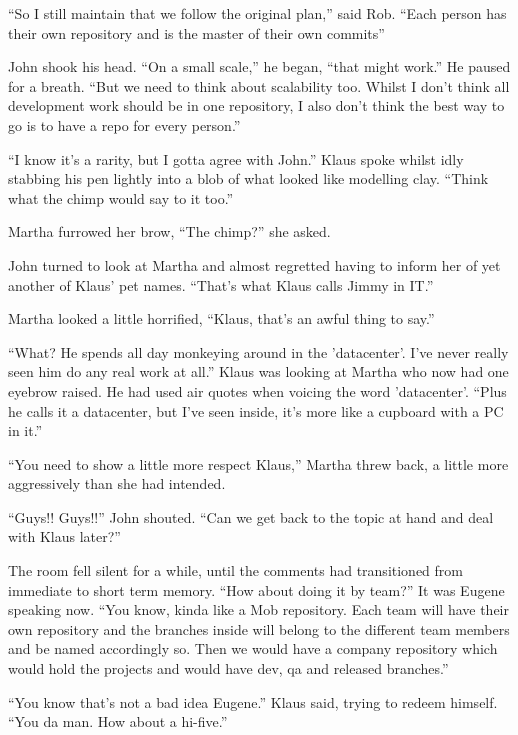 \begin{trenches}
``So I still maintain that we follow the original plan,'' said Rob.
``Each person has their own repository and is the master of their own commits''

John shook his head.
``On a small scale,'' he began,
``that might work.''
He paused for a breath.
``But we need to think about scalability too. Whilst I don't think all development work should be in one repository, I also don't think the best way to go is to have a repo for every person.''

``I know it's a rarity, but I gotta agree with John.'' Klaus spoke whilst idly stabbing his pen lightly into a blob of what looked like modelling clay.
``Think what the chimp would say to it too.''

Martha furrowed her brow,
``The chimp?'' she asked.

John turned to look at Martha and almost regretted having to inform her of yet another of Klaus' pet names.
``That's what Klaus calls Jimmy in IT.''

Martha looked a little horrified,
``Klaus, that's an awful thing to say.''

``What? He spends all day monkeying around in the 'datacenter'. I've never really seen him do any real work at all.''
Klaus was looking at Martha who now had one eyebrow raised.
He had used air quotes when voicing the word 'datacenter'.
``Plus he calls it a datacenter, but I've seen inside, it's more like a cupboard with a PC in it.''

``You need to show a little more respect Klaus,'' Martha threw back, a little more aggressively than she had intended.

``Guys!! Guys!!'' John shouted.
``Can we get back to the topic at hand and deal with Klaus later?''

The room fell silent for a while, until the comments had transitioned from immediate to short term memory.
``How about doing it by team?''
It was Eugene speaking now.
``You know, kinda like a Mob repository. Each team will have their own repository and the branches inside will belong to the different team members and be named accordingly so. Then we would have a company repository which would hold the projects and would have dev, qa and released branches.''

``You know that's not a bad idea Eugene.'' Klaus said, trying to redeem himself.
``You da man. How about a hi-five.''

\end{trenches}

